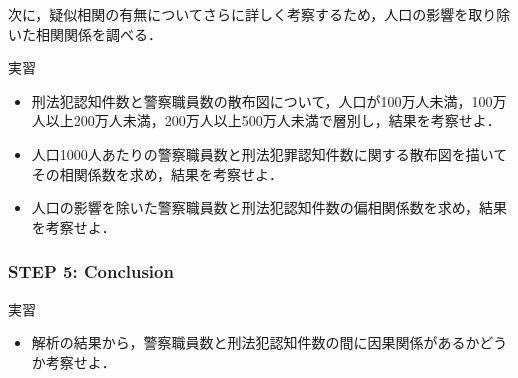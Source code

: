 
\vspace{0.5cm}
%
次に，疑似相関の有無についてさらに詳しく考察するため，人口の影響を取り除いた相関関係を調べる．
%
\begin{itembox}[l]{実習}
%
\begin{itemize}
\item
刑法犯認知件数と警察職員数の散布図について，人口が100万人未満，100万人以上200万人未満，200万人以上500万人未満で層別し，結果を考察せよ．
\item
人口1000人あたりの警察職員数と刑法犯罪認知件数に関する散布図を描いてその相関係数を求め，結果を考察せよ．
\item
人口の影響を除いた警察職員数と刑法犯認知件数の偏相関係数を求め，結果を考察せよ．
\end{itemize}
%
\end{itembox}
%





\subsubsection*{STEP 5: Conclusion}

%
\begin{itembox}[l]{実習}
%
\begin{itemize}
\item
解析の結果から，警察職員数と刑法犯認知件数の間に因果関係があるかどうか考察せよ．
\end{itemize}
%
\end{itembox}
%

